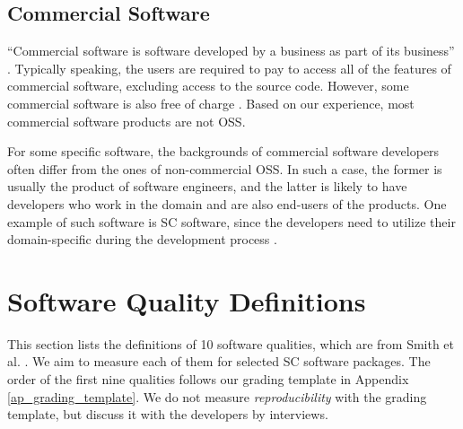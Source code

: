 \subsection{Commercial Software}
``Commercial software is software developed by a business as part of its business'' \cite{GNU2019}.
Typically speaking, the users are required to pay to access all of the features of commercial software, excluding access to the source code. However, some commercial software is also free of charge \cite{GNU2019}. Based on our experience, most commercial software products are not OSS.

For some specific software, the backgrounds of commercial software developers often differ from the ones of non-commercial OSS. In such a case, the former is usually the product of software engineers, and the latter is likely to have developers who work in the domain and are also end-users of the products. One example of such software is SC software, since the developers need to utilize their domain-specific during the development process \cite{Wilson2014}.

\section{Software Quality Definitions}
\label{sec_software_quality}

This section lists the definitions of 10 software qualities, which are from Smith et al. \cite{SmithEtAl2020}. We aim to measure each of them for selected SC software packages. The order of the first nine qualities follows our grading template in Appendix \ref{ap_grading_template}. We do not measure \textit{reproducibility} with the grading template, but discuss it with the developers by interviews.

